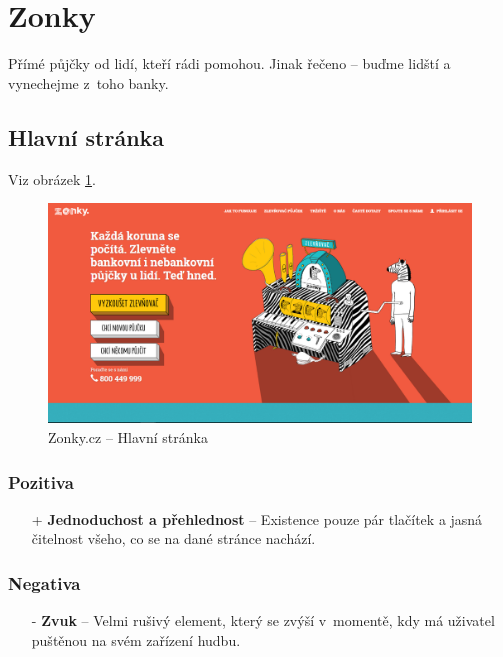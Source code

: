 \section{Zonky}
\label{analyza:zonky}

Přímé půjčky od lidí, kteří rádi pomohou. Jinak řečeno -- buďme lidští a vynechejme z~toho banky.

\subsection{Hlavní stránka}
Viz obrázek \ref{fig:zonky:home}.
\begin{figure}[h]
    \centering
    \includegraphics[width=1.0\textwidth]{media/zonky/home.png}
    \caption{Zonky.cz -- Hlavní stránka}
    \label{fig:zonky:home}
\end{figure}
\subsubsection*{Pozitiva}
\begin{itemize}
    \item[+] \textbf{Jednoduchost a přehlednost} -- Existence pouze pár tlačítek a jasná čitelnost všeho, co se na dané stránce nachází.
\end{itemize}
\subsubsection*{Negativa}
\begin{itemize}
    \item[-] \textbf{Zvuk} -- Velmi rušivý element, který se zvýší v~momentě, kdy má uživatel puštěnou na svém zařízení hudbu.
\end{itemize}



